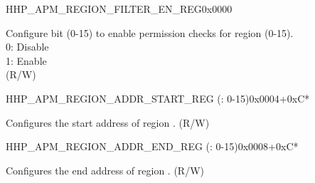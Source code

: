 \begin{register}{H}{HP\_APM\_REGION\_FILTER\_EN\_REG}{0x0000}\label{regdesc:HPAPMREGIONFILTERENREG}
%
%
\regnewline%
\begin{regdesc}\begin{reglist}
\label{fielddesc:HPAPMREGIONFILTEREN}\item [HP\_APM\_REGION\_FILTER\_EN] Configure bit  (0-15) to enable permission checks for region  (0-15).\\
0: Disable \\
1: Enable  \\ (R/W)
\end{reglist}\end{regdesc}
\end{register}


\begin{register}{H}{HP\_APM\_REGION\_ADDR\_START\_REG (: 0-15)}{0x0004+0xC*}\label{regdesc:HPAPMREGIONNADDRSTARTREG}
%
\regnewline%
\begin{regdesc}\begin{reglist}
\label{fielddesc:HPAPMREGIONNADDRSTART}\item [HP\_APM\_REGION\regindex{n}\_ADDR\_START] Configures the start address of region . (R/W)
\end{reglist}\end{regdesc}
\end{register}


\begin{register}{H}{HP\_APM\_REGION\_ADDR\_END\_REG (: 0-15)}{0x0008+0xC*}\label{regdesc:HPAPMREGIONNADDRENDREG}
%
\regnewline%
\begin{regdesc}\begin{reglist}
\label{fielddesc:HPAPMREGIONNADDREND}\item [HP\_APM\_REGION\regindex{n}\_ADDR\_END] Configures the end address of region . (R/W)
\end{reglist}\end{regdesc}
\end{register}


